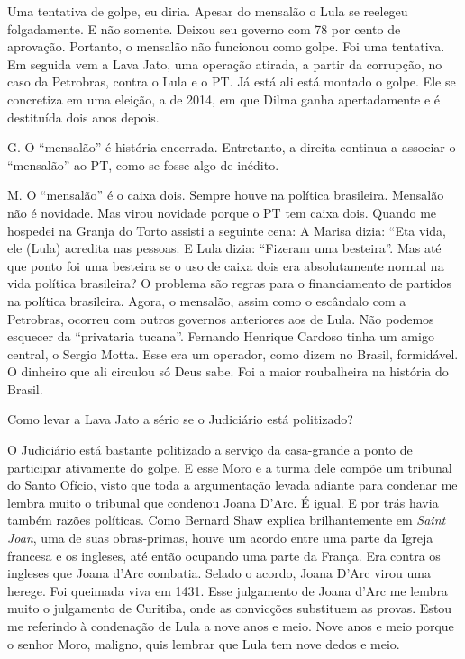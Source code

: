 \falaM Uma tentativa de golpe, eu diria. Apesar do mensalão o Lula se
reelegeu folgadamente. E não somente. Deixou seu governo com 78 por
cento de aprovação. Portanto, o mensalão não funcionou como golpe. Foi
uma tentativa. Em seguida vem a Lava Jato, uma operação atirada, a
partir da corrupção, no caso da Petrobras, contra o Lula e o PT. Já está
ali está montado o golpe. Ele se concretiza em uma eleição, a de 2014,
em que Dilma ganha apertadamente e é destituída dois anos depois.

G. O ``mensalão'' é história encerrada. Entretanto, a direita continua a
associar o ``mensalão'' ao PT, como se fosse algo de inédito.

M. O ``mensalão'' é o caixa dois. Sempre houve na política brasileira.
Mensalão não é novidade. Mas virou novidade porque o PT tem caixa dois.
Quando me hospedei na Granja do Torto assisti a seguinte cena: A Marisa
dizia: ``Eta vida, ele (Lula) acredita nas pessoas. E Lula dizia:
``Fizeram uma besteira''. Mas até que ponto foi uma besteira se o uso de
caixa dois era absolutamente normal na vida política brasileira? O
problema são regras para o financiamento de partidos na política
brasileira. Agora, o mensalão, assim como o escândalo com a Petrobras,
ocorreu com outros governos anteriores aos de Lula. Não podemos esquecer
da ``privataria tucana''. Fernando Henrique Cardoso tinha um amigo
central, o Sergio Motta. Esse era um operador, como dizem no Brasil,
formidável. O dinheiro que ali circulou só Deus sabe. Foi a maior
roubalheira na história do Brasil.

\falaG Como levar a Lava Jato a sério se o Judiciário está politizado?

\falaM O Judiciário está bastante politizado a serviço da casa-grande a
ponto de participar ativamente do golpe. E esse Moro e a turma dele
compõe um tribunal do Santo Ofício, visto que toda a argumentação levada
adiante para condenar me lembra muito o tribunal que condenou Joana
D'Arc. É igual. E por trás havia também razões políticas. Como Bernard
Shaw explica brilhantemente em \emph{Saint Joan}, uma de suas
obras-primas, houve um acordo entre uma parte da Igreja francesa e os
ingleses, até então ocupando uma parte da França. Era contra os ingleses
que Joana d'Arc combatia. Selado o acordo, Joana D'Arc virou uma herege.
Foi queimada viva em 1431. Esse julgamento de Joana d'Arc me lembra
muito o julgamento de Curitiba, onde as convicções substituem as provas.
Estou me referindo à condenação de Lula a nove anos e meio. Nove anos e
meio porque o senhor Moro, maligno, quis lembrar que Lula tem nove dedos
e meio.

